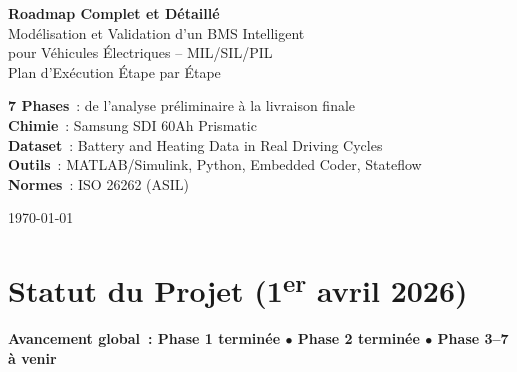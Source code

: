 \documentclass[a4paper,12pt]{article}
\begin{document}
\begin{titlepage}
\centering
\vspace*{2cm}
{\Huge\bfseries\textcolor{bmsprimary}{Roadmap Complet et Détaillé}}\\[0.5cm]
{\LARGE\textcolor{bmssecondary}{Modélisation et Validation d'un BMS Intelligent}}\\[0.3cm]
{\Large\textcolor{bmssecondary}{pour Véhicules Électriques -- MIL/SIL/PIL}}\\[1.5cm]
{\large Plan d'Exécution Étape par Étape}\\[2cm]

\begin{tcolorbox}[colback=bmslight, colframe=bmsprimary, width=12cm]
\centering
\textbf{7 Phases}~: de l'analyse préliminaire à la livraison finale\\[5pt]
\textbf{Chimie}~: Samsung SDI 60Ah Prismatic\\
\textbf{Dataset}~: Battery and Heating Data in Real Driving Cycles\\
\textbf{Outils}~: MATLAB/Simulink, Python, Embedded Coder, Stateflow\\
\textbf{Normes}~: ISO 26262 (ASIL)
\end{tcolorbox}

\vfill
{\large\textcolor{bmsgray}{\today}}
\end{titlepage}

\tableofcontents
\newpage

\section*{Statut du Projet (1\textsuperscript{er} avril 2026)}

\begin{tcolorbox}[colback=bmslight, colframe=bmsprimary]
\centering
\textbf{Avancement global~: Phase 1 terminée $\bullet$ Phase 2 terminée $\bullet$ Phase 3--7 à venir}
\end{tcolorbox}
\end{document}
